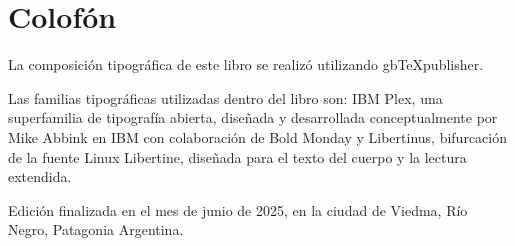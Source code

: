 \chapter*{Colofón}
\justifying
La composición tipográfica de este libro se realizó utilizando gbTeXpublisher.

Las familias tipográficas utilizadas dentro del libro son: IBM Plex, una superfamilia de tipografía abierta, diseñada y desarrollada conceptualmente por Mike Abbink en IBM con colaboración de Bold Monday y Libertinus, bifurcación de la fuente Linux Libertine, diseñada para el texto del cuerpo y la lectura extendida.

Edición finalizada en el mes de junio de 2025, en la ciudad de Viedma, Río Negro, Patagonia Argentina.
